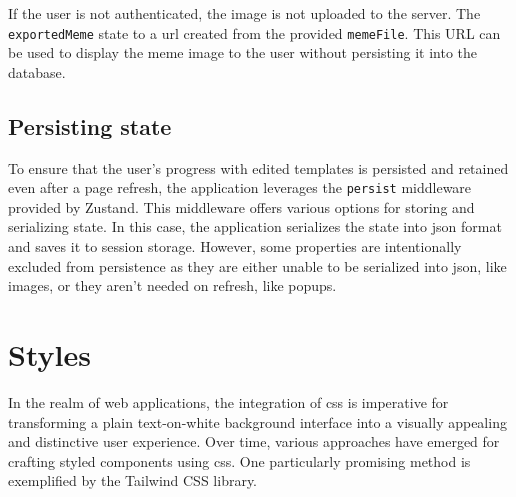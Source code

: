 If the user is not authenticated, the image is not uploaded to the server. The \texttt{exportedMeme} state to a \acrshort{url} created from the provided \texttt{memeFile}. This URL can be used to display the meme image to the user without persisting it into the database.




\subsection{Persisting state}

To ensure that the user's progress with edited templates is persisted and retained even after a page refresh, the application leverages the \texttt{persist} middleware provided by Zustand. This middleware offers various options for storing and serializing state. In this case, the application serializes the state into \acrshort{json} format and saves it to session storage. However, some properties are intentionally excluded from persistence as they are either unable to be serialized into \acrshort{json}, like images, or they aren't needed on refresh, like popups.


\section{Styles}

In the realm of web applications, the integration of \acrfull{css} is imperative for transforming a plain text-on-white background interface into a visually appealing and distinctive user experience.\cite{what-is-css} Over time, various approaches have emerged for crafting styled components using \acrshort{css}. One particularly promising method is exemplified by the Tailwind CSS library.\cite{why-tailwind}

